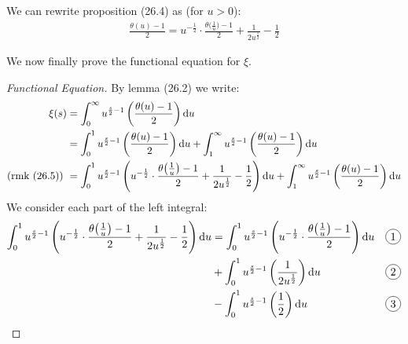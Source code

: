\begin{remark}
We can rewrite proposition (26.4) as (for $u>0$):
\begin{align*}
    \frac{\theta(u) - 1}{2} = u^{- \frac{1}{2}} \cdot \frac{\theta\big(\tfrac{1}{u}\big) - 1}{2} + \frac{1}{2 u^{\frac{1}{2}}} - \frac{1}{2}
\end{align*}
\end{remark}

We now finally prove the functional equation for $\xi$.\\

\begin{proof}[Functional Equation]
By lemma (26.2) we write:
\begin{align*}
    \xi(s) &= \int_0^\infty u^{\frac{s}{2} - 1} \br{\frac{\theta(u) - 1}{2}} \dif u\\
    &= \int_0^1 u^{\frac{s}{2} - 1} \br{\frac{\theta(u) - 1}{2}} \dif u + \int_1^\infty u^{\frac{s}{2} - 1} \br{\frac{\theta(u) - 1}{2}} \dif u\\
    \text{(rmk (26.5)) } &= \int_0^1 u^{\frac{s}{2} - 1} \br{u^{- \frac{1}{2}} \cdot \frac{\theta\big(\tfrac{1}{u}\big) - 1}{2} + \frac{1}{2 u^{\frac{1}{2}}} - \frac{1}{2}} \dif u + \int_1^\infty u^{\frac{s}{2} - 1} \br{\frac{\theta(u) - 1}{2}} \dif u\\ 
\end{align*}
We consider each part of the left integral:
\begin{align*}
    \int_0^1 u^{\frac{s}{2} - 1} \br{u^{- \frac{1}{2}} \cdot \frac{\theta\big(\tfrac{1}{u}\big) - 1}{2} + \frac{1}{2 u^{\frac{1}{2}}} - \frac{1}{2}} \dif u &= \int_0^1 u^{\frac{s}{2} - 1} \br{u^{- \frac{1}{2}} \cdot \frac{\theta\big(\tfrac{1}{u}\big) - 1}{2}} \dif u && \circled{1} \\& + \int_0^1 u^{\frac{s}{2} - 1} \br{\frac{1}{2 u^{\frac{1}{2}}}} \dif u && \circled{2} \\& - \int_0^1 u^{\frac{s}{2} - 1} \br{\frac{1}{2}} \dif u && \circled{3}
\end{align*}


\end{proof}
